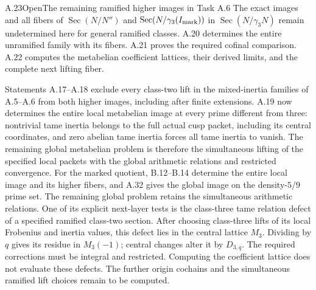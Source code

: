 \begin{statement}{A.23}{Open}{The remaining ramified higher images in Task A.6}
The exact images and all fibers of
$\operatorname{Sec}(N/N'')$ and
$\operatorname{Sec}(N/\gamma_3(I_{\rm mark}))$ in
$\operatorname{Sec}(N/\gamma_3N)$ remain undetermined here
for general ramified classes. A.20 determines the entire
unramified family with its fibers. A.21 proves the required
cofinal comparison. A.22 computes the metabelian coefficient
lattices, their derived limits, and the complete next lifting
fiber.
\end{statement}
Statements A.17--A.18 exclude every class-two lift in the
mixed-inertia families of A.5--A.6 from both higher images,
including after finite extensions. A.19 now determines the
entire local metabelian image at every prime different from
three: nontrivial tame inertia belongs to the full actual cusp
packet, including its central coordinates, and zero abelian
tame inertia forces all tame inertia to vanish.
The remaining global metabelian problem is therefore the
simultaneous lifting of the specified local packets with the
global arithmetic relations and restricted convergence.
For the marked quotient, B.12--B.14 determine the entire
local image and its higher fibers, and A.32 gives the global
image on the density-$5/9$ prime set. The remaining global
problem retains the simultaneous arithmetic relations.
One of its explicit next-layer tests is the class-three
tame relation defect of a specified ramified class-two section.
After choosing class-three lifts of its local Frobenius and
inertia values, this defect lies in the central lattice $M_3$.
Dividing by $q$ gives its residue in $M_3(-1)$; central changes
alter it by $D_{3,q}$. The required corrections must be integral
and restricted. Computing the coefficient lattice does not
evaluate these defects. The further origin cochains and the
simultaneous ramified lift choices remain to be computed.

